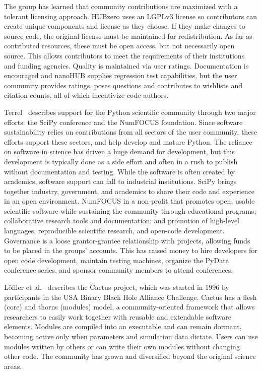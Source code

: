 \documentclass[11pt, oneside]{amsart}
\newcommand{\toolname}[1] {\textsf{#1}}
\begin{document}
The group has learned that community contributions are maximized with
a tolerant licensing approach. \toolname{HUBzero} uses an LGPLv3
license so contributors can create unique components and license as
they choose. If they make changes to source code, the original license
must be maintained for redistribution. As far as contributed
resources, these must be open access, but not necessarily open
source. This allows contributors to meet the requirements of their
institutions and funding agencies. Quality is maintained via user
ratings. Documentation is encouraged and nanoHUB supplies regression
test capabilities, but the user community provides ratings, poses
questions and contributes to wishlists and citation counts, all of
which incentivize code authors.

Terrel~\cite{Terrel_WSSSPE} describes support for the Python
scientific community through two major efforts: the SciPy conference
and the NumFOCUS foundation.  Since software sustainability relies on
contributions from all sectors of the user community, these efforts
support these sectors, and help develop and mature Python.
%
The reliance on software in science has driven a huge demand for
development, but this development is typically done as a side effort
and often in a rush to publish without documentation and
testing. While the software is often created by academics, software
support can fall to industrial institutions. SciPy brings together
industry, government, and academics to share their code and experience
in an open environment.
%
NumFOCUS in a non-profit that promotes open, usable scientific
software while sustaining the community through educational programs;
collaborative research tools and documentation; and promotion of
high-level languages, reproducible scientific research, and open-code
development. Governance is a loose grantor-grantee relationship with
projects, allowing funds to be placed in the groups' accounts. This
has raised money to hire developers for open code development,
maintain testing machines, organize the PyData conference series, and
sponsor community members to attend conferences.

L\"{o}ffler et al.~\cite{Loffler_WSSSPE} describes the Cactus project,
which was started in 1996 by participants in the USA Binary Black Hole
Alliance Challenge. Cactus has a flesh (core) and thorns (modules)
model, a community-oriented framework that allows researchers to
easily work together with reusable and extendable software
elements. Modules are compiled into an executable and can remain
dormant, becoming active only when parameters and simulation data
dictate. Users can use modules written by others or can write their
own modules without changing other code. The community has grown and
diversified beyond the original science areas.
\end{document}
